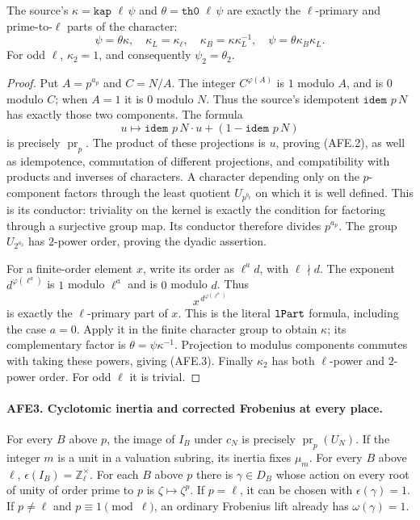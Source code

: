 \documentclass[11pt,a4paper]{article}
\numberwithin{equation}{section}
\theoremstyle{remark}\newtheorem{remark}[theorem]{Remark}
\begin{document}
The source's \(\kappa=\texttt{kap }\ell\,\psi\) and
\(\theta=\texttt{th0 }\ell\,\psi\) are exactly the
\(\ell\)-primary and prime-to-\(\ell\) parts of the character:
\[
 \psi=\theta\kappa,\quad
 \kappa_L=\kappa_\ell,\quad
 \kappa_B=\kappa\kappa_L^{-1},\quad
 \psi=\theta\kappa_B\kappa_L.                             \tag{AFE.3}
\]
For odd \(\ell\), \(\kappa_2=1\), and consequently
\(\psi_2=\theta_2\).

\begin{proof}
Put \(A=p^{a_p}\) and \(C=N/A\).  The integer
\(C^{\varphi(A)}\) is \(1\) modulo \(A\), and is \(0\)
modulo \(C\); when \(A=1\) it is \(0\) modulo \(N\).
Thus the source's idempotent
\(\texttt{idem }p\,N\) has exactly those two components.
The formula
\[
 u\longmapsto \texttt{idem }p\,N\cdot u+
                         (1-\texttt{idem }p\,N)
\]
is precisely \(\operatorname{pr}_p\).  The product of these
projections is \(u\), proving (AFE.2), as well as
idempotence, commutation of different projections, and
compatibility with products and inverses of characters.
A character depending only on the \(p\)-component factors
through the least quotient \(U_{p^{b_p}}\) on which it is
well defined.  This is its conductor: triviality on the
kernel is exactly the condition for factoring through a
surjective group map.  Its conductor therefore divides
\(p^{a_p}\).  The group \(U_{2^{a_2}}\) has \(2\)-power
order, proving the dyadic assertion.

For a finite-order element \(x\), write its order as
\(\ell^a d\), with \(\ell\nmid d\).
The exponent \(d^{\varphi(\ell^a)}\) is \(1\) modulo
\(\ell^a\) and is \(0\) modulo \(d\).  Thus
\[
 x^{\,d^{\varphi(\ell^a)}}
\]
is exactly the \(\ell\)-primary part of \(x\).
This is the literal \(\texttt{l\allowbreak Part}\) formula, including
the case \(a=0\).  Apply it in the finite character group
to obtain \(\kappa\); its complementary factor is
\(\theta=\psi\kappa^{-1}\).
Projection to modulus components commutes with taking
these powers, giving (AFE.3).
Finally \(\kappa_2\) has both \(\ell\)-power and
\(2\)-power order.  For odd \(\ell\) it is trivial.
\end{proof}

\paragraph{AFE3. Cyclotomic inertia and corrected Frobenius at every place.}
\label{claim:AFE3}
For every \(B\) above \(p\), the image of \(I_B\) under
\(c_N\) is precisely \(\operatorname{pr}_p(U_N)\).
If the integer \(m\) is a unit in a valuation subring,
its inertia fixes \(\mu_m\).
For every \(B\) above \(\ell\),
\(\epsilon(I_B)=\mathbb Z_\ell^\times\).
For each \(B\) above \(p\) there is \(\gamma\in D_B\)
whose action on every root of unity of order prime to
\(p\) is \(\zeta\mapsto\zeta^p\).  If \(p=\ell\), it
can be chosen with \(\epsilon(\gamma)=1\).
If \(p\ne\ell\) and \(p\equiv1\pmod\ell\), an ordinary
Frobenius lift already has \(\omega(\gamma)=1\).
\end{document}
